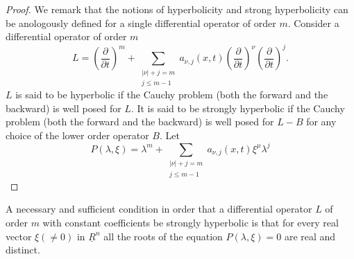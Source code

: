 \begin{proof}
We remark that the notions of hyperbolicity and strong hyperbolicity
can be anologously defined for a single differential operator of order
$m$. Consider a differential operator of order $m$ 
\begin{equation}
 L= \left(\frac{\partial}{\partial t}\right)^m + \sum_{\substack{| \nu | + j =m
     \\  j \leq m-1}} a_{\nu,  j} (x, t) \left(\frac{\partial}{\partial t}
 \right)^\nu \left(\frac{\partial}{\partial t}\right)^j.
 \tag{5.9}\label{chap2-eq5.9} 
\end{equation}
$L$ is said to be hyperbolic if the Cauchy problem (both the forward
and the backward) is well posed for $L$. It is said to be strongly
hyperbolic if the Cauchy problem (both the forward and the backward)
is well posed for $L-B$ for any choice of the lower order operator
$B$. Let  
 \begin{equation}
P(\lambda,  \xi ) = \lambda^m + \sum_{\substack{| \nu | + j = m \\  j
    \leq m-1}} a_{\nu,  j} (x, t ) \xi^\mu \lambda^j
\tag{5.10}\label{chap2-eq5.10} 
 \end{equation} 
\end{proof}

\begin{proposition}\label{chap2-sec5-prop3}%
A necessary and sufficient condition in order that a differential
operator $L$ of order $m$ with constant coefficients be strongly
hyperbolic is that for every real vector $\xi (\neq 0)$ in $\underline{R}^n$
all the roots of the equation $P(\lambda,  \xi) = 0$ are real and
distinct. 
\end{proposition} 

